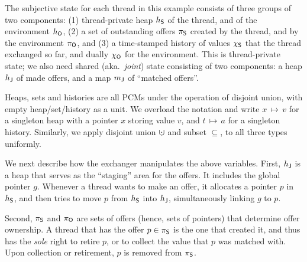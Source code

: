 The subjective state for each thread in this example consists of three
groups of two components: (1) thread-private heap $h_{\mathsf{S}}$ of the
thread, and of the environment $h_{\mathsf{O}}$, (2) a set of outstanding
offers $\pi_{\mathsf{S}}$ created by the thread, and by the environment
$\pi_{\mathsf{O}}$, and (3) a time-stamped history of values $\chi_{\mathsf{S}}$ that the
thread exchanged so far, and dually $\chi_{\mathsf{O}}$ for the environment.
This is thread-private state; we also need shared (aka.~\emph{joint})
state consisting of two components: a heap $h_{\mathsf{J}}$ of made offers,
and a map ${m_{\mathsf{J}}}$ of ``matched offers''.

Heaps, sets and histories are all PCMs under the operation of disjoint
union, with empty heap/set/history as a unit. We overload the notation
and write $x\,{\mapsto}\,v$ for a singleton heap with a pointer $x$
storing value $v$, and $t\,{\mapsto}\,a$ for a singleton
history. Similarly, we apply disjoint union $\hunion$ and subset
$\subseteq$, to all three types uniformly.

We next describe how the exchanger manipulates the above variables.
First, $h_{\mathsf{J}}$ is a heap that serves as the ``staging'' area for the
offers. It includes the global pointer $g$. Whenever a thread wants to
make an offer, it allocates a pointer $p$ in $h_{\mathsf{S}}$, and then tries
to move $p$ from $h_{\mathsf{S}}$ into $h_{\mathsf{J}}$, simultaneously linking $g$ to
$p$.

Second, $\pi_{\mathsf{S}}$ and $\pi_{\mathsf{O}}$ are sets of offers (hence, sets of
pointers) that determine offer ownership. A thread that has the offer
$p \in \pi_{\mathsf{S}}$ is the one that created it, and thus has the
\emph{sole} right to retire $p$, or to collect the value that $p$ was
matched with. Upon collection or retirement, $p$ is removed from
$\pi_{\mathsf{S}}$.


